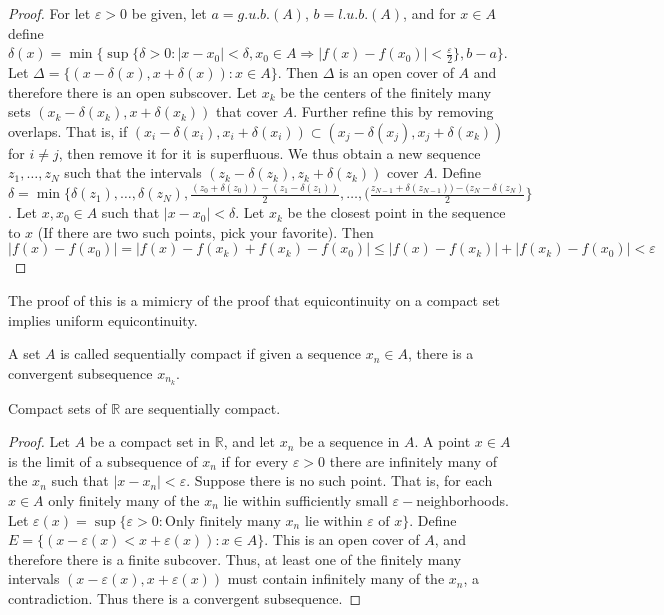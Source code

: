 \documentclass[crop=false,class=book]{standalone}
\begin{document}
\begin{proof}
For let $\varepsilon>0$ be given, let $a=g.u.b.(A)$, $b=l.u.b.(A)$, and for $x\in A$ define $\delta(x) = \min\{\sup\{\delta>0: |x-x_0|<\delta,x_0\in A\Rightarrow |f(x)-f(x_0)|<\frac{\varepsilon}{2}\},b-a\}$. Let $\Delta = \{(x-\delta(x),x+\delta(x)):x\in A\}$. Then $\Delta$ is an open cover of $A$ and therefore there is an open subscover. Let $x_k$ be the centers of the finitely many sets $(x_k-\delta(x_k),x+\delta(x_k))$ that cover $A$. Further refine this by removing overlaps. That is, if $(x_i-\delta(x_i),x_i+\delta(x_i))\subset (x_j-\delta(x_j),x_j+\delta(x_k))$ for $i\ne j$, then remove it for it is superfluous. We thus obtain a new sequence $z_1,\hdots, z_N$ such that the intervals $(z_k-\delta(z_k),z_k+\delta(z_k))$ cover $A$. Define $\delta = \min\{\delta(z_1),\hdots,\delta(z_N), \frac{(z_0+\delta(z_0))-(z_1-\delta(z_1))}{2},\hdots,(\frac{z_{N-1}+\delta(z_{N-1}))-(z_{N}-\delta(z_{N})}{2}\}$. Let $x,x_0\in A$ such that $|x-x_0|<\delta$. Let $x_k$ be the closest point in the sequence to $x$ (If there are two such points, pick your favorite). Then $|f(x)-f(x_0)|=|f(x)-f(x_k)+f(x_k)-f(x_0)|\leq |f(x)-f(x_k)|+|f(x_k)-f(x_0)|<\varepsilon$
\end{proof}
\begin{remark}
The proof of this is a mimicry of the proof that equicontinuity on a compact set implies uniform equicontinuity.
\end{remark}
\begin{definition}
A set $A$ is called sequentially compact if given a sequence $x_n\in A$, there is a convergent subsequence $x_{n_k}$.
\end{definition}
\begin{theorem}
Compact sets of $\mathbb{R}$ are sequentially compact.
\end{theorem}
\begin{proof}
Let $A$ be a compact set in $\mathbb{R}$, and let $x_n$ be a sequence in $A$. A point $x\in A$ is the limit of a subsequence of $x_n$ if for every $\varepsilon>0$ there are infinitely many of the $x_n$ such that $|x-x_n|<\varepsilon$. Suppose there is no such point. That is, for each $x\in A$ only finitely many of the $x_n$ lie within sufficiently small $\varepsilon-$neighborhoods. Let $\varepsilon(x) = \sup\{\varepsilon>0:\textrm{Only finitely many }x_n \textrm{ lie within } \varepsilon \textrm{ of } x\}$. Define $E=\{(x-\varepsilon(x)<x+\varepsilon(x)):x\in A\}$. This is an open cover of $A$, and therefore there is a finite subcover. Thus, at least one of the finitely many intervals $(x-\varepsilon(x),x+\varepsilon(x))$ must contain infinitely many of the $x_n$, a contradiction. Thus there is a convergent subsequence.
\end{proof}
\end{document}
